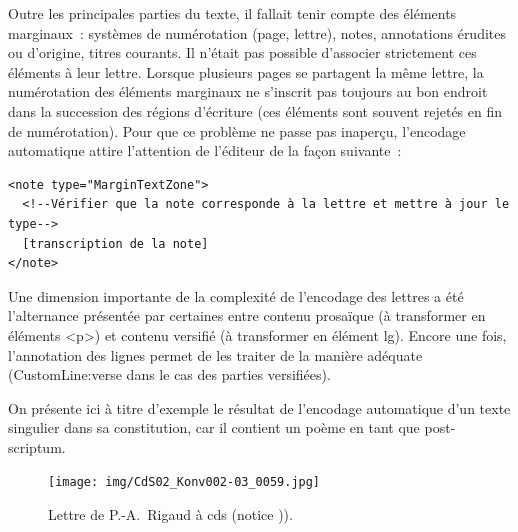 \documentclass[a4paper,12pt,twoside]{book}
\begin{document}
			Outre les principales parties du texte, il fallait tenir compte des éléments marginaux~: systèmes de numérotation (page, lettre), notes, annotations érudites ou d'origine, titres courants. Il n'était pas possible d'associer strictement ces éléments à leur lettre. Lorsque plusieurs pages se partagent la même lettre, la numérotation des éléments marginaux ne s'inscrit pas toujours au bon endroit dans la succession des régions d'écriture (ces éléments sont souvent rejetés en fin de numérotation). Pour que ce problème ne passe pas inaperçu, l'encodage automatique attire l'attention de l'éditeur de la façon suivante~:
			
			\begin{verbatim}
<note type="MarginTextZone">
  <!--Vérifier que la note corresponde à la lettre et mettre à jour le type-->
  [transcription de la note]
</note>
			\end{verbatim}
		
			Une dimension importante de la complexité de l'encodage des lettres a été l'alternance présentée par certaines entre contenu prosaïque (à transformer en éléments \textsf{<p>}) et contenu versifié (à transformer en élément \textsf{lg}). Encore une fois, l'annotation des lignes permet de les traiter de la manière adéquate (\textsf{CustomLine:verse} dans le cas des parties versifiées). 
			
			On présente ici à titre d'exemple le résultat de l'encodage automatique d'un texte singulier dans sa constitution, car il contient un poème en tant que post-scriptum.
			
			\begin{figure}[!h]
				\centering
				\texttt{[image: img/CdS02\_Konv002-03\_0059.jpg]}
				\caption{Lettre de P.-A.~Rigaud à \gls{cds} (notice \cite{CdS02059})).}
				\label{}
			\end{figure}
			
			\small
			
\end{document}
